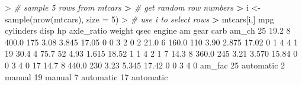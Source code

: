 \documentclass[
]{book}
\newenvironment{Shaded}{\begin{snugshade}}{\end{snugshade}}
\newcommand{\AttributeTok}[1]{\textcolor[rgb]{0.77,0.63,0.00}{#1}}
\newcommand{\CommentTok}[1]{\textcolor[rgb]{0.56,0.35,0.01}{\textit{#1}}}
\newcommand{\DecValTok}[1]{\textcolor[rgb]{0.00,0.00,0.81}{#1}}
\newcommand{\ErrorTok}[1]{\textcolor[rgb]{0.64,0.00,0.00}{\textbf{#1}}}
\newcommand{\FloatTok}[1]{\textcolor[rgb]{0.00,0.00,0.81}{#1}}
\newcommand{\FunctionTok}[1]{\textcolor[rgb]{0.00,0.00,0.00}{#1}}
\newcommand{\NormalTok}[1]{#1}
\newcommand{\OtherTok}[1]{\textcolor[rgb]{0.56,0.35,0.01}{#1}}
\newcommand{\SpecialCharTok}[1]{\textcolor[rgb]{0.00,0.00,0.00}{#1}}
\begin{document}
\begin{Shaded}
\begin{Highlighting}[]
\SpecialCharTok{\textgreater{}} \CommentTok{\# sample 5 rows from mtcars}
\ErrorTok{\textgreater{}} \CommentTok{\# get random row numbers}
\ErrorTok{\textgreater{}}\NormalTok{ i }\OtherTok{\textless{}{-}} \FunctionTok{sample}\NormalTok{(}\FunctionTok{nrow}\NormalTok{(mtcars), }\AttributeTok{size =} \DecValTok{5}\NormalTok{)}
\SpecialCharTok{\textgreater{}} \CommentTok{\# use i to select rows}
\ErrorTok{\textgreater{}}\NormalTok{ mtcars[i,]}
\NormalTok{    mpg cylinders  disp  hp axle\_ratio weight  qsec engine am gear carb am\_ch}
\DecValTok{25} \FloatTok{19.2}         \DecValTok{8} \FloatTok{400.0} \DecValTok{175}       \FloatTok{3.08}  \FloatTok{3.845} \FloatTok{17.05}      \DecValTok{0}  \DecValTok{0}    \DecValTok{3}    \DecValTok{2}     \DecValTok{0}
\DecValTok{2}  \FloatTok{21.0}         \DecValTok{6} \FloatTok{160.0} \DecValTok{110}       \FloatTok{3.90}  \FloatTok{2.875} \FloatTok{17.02}      \DecValTok{0}  \DecValTok{1}    \DecValTok{4}    \DecValTok{4}     \DecValTok{1}
\DecValTok{19} \FloatTok{30.4}         \DecValTok{4}  \FloatTok{75.7}  \DecValTok{52}       \FloatTok{4.93}  \FloatTok{1.615} \FloatTok{18.52}      \DecValTok{1}  \DecValTok{1}    \DecValTok{4}    \DecValTok{2}     \DecValTok{1}
\DecValTok{7}  \FloatTok{14.3}         \DecValTok{8} \FloatTok{360.0} \DecValTok{245}       \FloatTok{3.21}  \FloatTok{3.570} \FloatTok{15.84}      \DecValTok{0}  \DecValTok{0}    \DecValTok{3}    \DecValTok{4}     \DecValTok{0}
\DecValTok{17} \FloatTok{14.7}         \DecValTok{8} \FloatTok{440.0} \DecValTok{230}       \FloatTok{3.23}  \FloatTok{5.345} \FloatTok{17.42}      \DecValTok{0}  \DecValTok{0}    \DecValTok{3}    \DecValTok{4}     \DecValTok{0}
\NormalTok{      am\_fac}
\DecValTok{25}\NormalTok{ automatic}
\DecValTok{2}\NormalTok{     manual}
\DecValTok{19}\NormalTok{    manual}
\DecValTok{7}\NormalTok{  automatic}
\DecValTok{17}\NormalTok{ automatic}
\end{Highlighting}
\end{Shaded}
\end{document}
